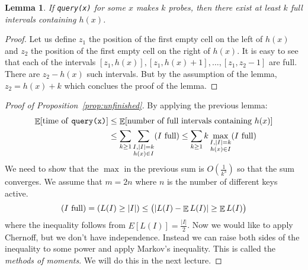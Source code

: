 \documentclass[11pt]{article}
\DeclareMathOperator*{\E}{\mathbb{E}}
\let\Pr\relax
\DeclareMathOperator*{\Pr}{\mathbb{P}}
\newtheorem{lemma}[theorem]{Lemma}
\theoremstyle{definition}
\begin{document}
\begin{lemma}
    If \texttt{query(x)} for some $x$ makes $k$ probes, then there exist at
    least $k$ full intervals containing $h(x)$.
\end{lemma}

\begin{proof}
    Let us define $z_1$ the position of the first empty cell on the left of
    $h(x)$ and $z_2$ the position of the first empty cell on the right of
    $h(x)$. It is easy to see that each of the intervals $[z_1, h(x)], [z_1,
    h(x)+1],\ldots,[z_1, z_2-1]$ are full. There are $z_2-h(x)$ such intervals.
    But by the assumption of the lemma, $z_2 = h(x)+ k$ which conclues the
    proof of the lemma.
\end{proof}

\begin{proof}[Proof of Proposition~\ref{prop:unfinished}]
By applying the previous lemma:
\begin{align*}
    \E[\text{time of \texttt{query(x)}}]
    &\leq \E[\text{number of full intervals
        containing $h(x)$}]\\
        &\leq \sum_{k\geq 1}\sum_{\substack{I, |I|=k\\h(x)\in I}} \Pr(I\text{
    full}) \leq \sum_{k\geq 1}k \max_{\substack{I, |I|=k\\ h(x)\in I}}\Pr(I\text{ full})
\end{align*}
We need to show that the $\max$ in the previous sum is
$O\left(\frac{1}{k^3}\right)$ so that the sum converges. We assume that $m=2n$
where $n$ is the number of different keys active.
\begin{displaymath}
    \Pr(I\text{ full}) = \Pr(L(I)\geq |I|)
    \leq\Pr\big(|L(I)-\E L(I)|\geq \E L(I)\big)
\end{displaymath}
where the inequality follows from $E[L(I)] = \frac{|I|}{2}$.  Now we would like
to apply Chernoff, but we don't have independence. Instead we can raise both
sides of the inequality to some power and apply Markov's inequality. This is
called the \emph{methods of moments}. We will do this in the next lecture.
\end{proof}
\end{document}

